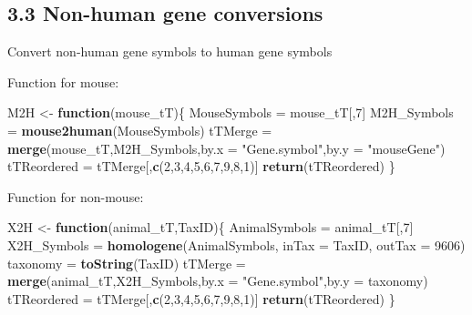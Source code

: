 \documentclass[
]{article}
\newenvironment{Shaded}{\begin{snugshade}}{\end{snugshade}}
\newcommand{\ControlFlowTok}[1]{\textcolor[rgb]{0.13,0.29,0.53}{\textbf{#1}}}
\newcommand{\DataTypeTok}[1]{\textcolor[rgb]{0.13,0.29,0.53}{#1}}
\newcommand{\DecValTok}[1]{\textcolor[rgb]{0.00,0.00,0.81}{#1}}
\newcommand{\KeywordTok}[1]{\textcolor[rgb]{0.13,0.29,0.53}{\textbf{#1}}}
\newcommand{\NormalTok}[1]{#1}
\newcommand{\StringTok}[1]{\textcolor[rgb]{0.31,0.60,0.02}{#1}}
\begin{document}
\hypertarget{non-human-gene-conversions}{%
\subsection{3.3 Non-human gene
conversions}\label{non-human-gene-conversions}}

Convert non-human gene symbols to human gene symbols

Function for mouse:

\begin{Shaded}
\begin{Highlighting}[]
\NormalTok{M2H <-}\StringTok{ }\ControlFlowTok{function}\NormalTok{(mouse_tT)\{}
\NormalTok{  MouseSymbols =}\StringTok{ }\NormalTok{mouse_tT[,}\DecValTok{7}\NormalTok{]}
\NormalTok{  M2H_Symbols =}\StringTok{ }\KeywordTok{mouse2human}\NormalTok{(MouseSymbols)}
\NormalTok{  tTMerge =}\StringTok{ }\KeywordTok{merge}\NormalTok{(mouse_tT,M2H_Symbols,}\DataTypeTok{by.x =} \StringTok{"Gene.symbol"}\NormalTok{,}\DataTypeTok{by.y =} \StringTok{"mouseGene"}\NormalTok{)}
\NormalTok{  tTReordered =}\StringTok{ }\NormalTok{tTMerge[,}\KeywordTok{c}\NormalTok{(}\DecValTok{2}\NormalTok{,}\DecValTok{3}\NormalTok{,}\DecValTok{4}\NormalTok{,}\DecValTok{5}\NormalTok{,}\DecValTok{6}\NormalTok{,}\DecValTok{7}\NormalTok{,}\DecValTok{9}\NormalTok{,}\DecValTok{8}\NormalTok{,}\DecValTok{1}\NormalTok{)]}
  \KeywordTok{return}\NormalTok{(tTReordered)}
\NormalTok{\}}
\end{Highlighting}
\end{Shaded}

Function for non-mouse:

\begin{Shaded}
\begin{Highlighting}[]
\NormalTok{X2H <-}\StringTok{ }\ControlFlowTok{function}\NormalTok{(animal_tT,TaxID)\{}
\NormalTok{  AnimalSymbols =}\StringTok{ }\NormalTok{animal_tT[,}\DecValTok{7}\NormalTok{]}
\NormalTok{  X2H_Symbols =}\StringTok{ }\KeywordTok{homologene}\NormalTok{(AnimalSymbols, }\DataTypeTok{inTax =}\NormalTok{ TaxID, }\DataTypeTok{outTax =} \DecValTok{9606}\NormalTok{)}
\NormalTok{  taxonomy =}\StringTok{ }\KeywordTok{toString}\NormalTok{(TaxID)}
\NormalTok{  tTMerge =}\StringTok{ }\KeywordTok{merge}\NormalTok{(animal_tT,X2H_Symbols,}\DataTypeTok{by.x =} \StringTok{"Gene.symbol"}\NormalTok{,}\DataTypeTok{by.y =}\NormalTok{ taxonomy)}
\NormalTok{  tTReordered =}\StringTok{ }\NormalTok{tTMerge[,}\KeywordTok{c}\NormalTok{(}\DecValTok{2}\NormalTok{,}\DecValTok{3}\NormalTok{,}\DecValTok{4}\NormalTok{,}\DecValTok{5}\NormalTok{,}\DecValTok{6}\NormalTok{,}\DecValTok{7}\NormalTok{,}\DecValTok{9}\NormalTok{,}\DecValTok{8}\NormalTok{,}\DecValTok{1}\NormalTok{)]}
  \KeywordTok{return}\NormalTok{(tTReordered)}
\NormalTok{\}}
\end{Highlighting}
\end{Shaded}
\end{document}
